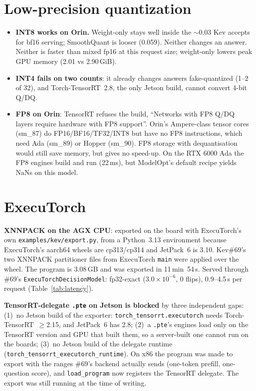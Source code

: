 \documentclass[10pt]{article}
\begin{document}
\section{Low-precision quantization}

\FloatBarrier
\begin{itemize}
\item \textbf{INT8 works on Orin.} Weight-only stays well inside the $\sim$0.03 Kev accepts for bf16 serving; SmoothQuant is looser (0.059). Neither changes an answer. Neither is faster than mixed fp16 at this request size; weight-only lowers peak GPU memory (2.01 vs 2.90\,GiB).
\item \textbf{INT4 fails on two counts}: it already changes answers fake-quantized (1--2 of 32), and Torch-TensorRT~2.8, the only Jetson build, cannot convert 4-bit Q/DQ.
\item \textbf{FP8 on Orin}: TensorRT refuses the build, ``Networks with FP8 Q/DQ layers require hardware with FP8 support''. Orin's Ampere-class tensor cores (sm\_87) do FP16/BF16/TF32/INT8 but have no FP8 instructions, which need Ada (sm\_89) or Hopper (sm\_90). FP8 storage with dequantisation would still save memory, but gives no speed-up. On the RTX 6000 Ada the FP8 engines build and run (22\,ms), but ModelOpt's default recipe yields NaNs on this model.
\end{itemize}

\section{ExecuTorch}
\textbf{XNNPACK on the AGX CPU}: exported on the board with ExecuTorch's own \texttt{examples/kev/export.py}, from a Python~3.13 environment because ExecuTorch's aarch64 wheels are cp313/cp314 and JetPack~6 is 3.10. Kev\#69's two XNNPACK partitioner files from ExecuTorch \texttt{main} were applied over the wheel. The program is 3.08\,GB and was exported in 11\,min~54\,s. Served through \#69's \texttt{ExecuTorchDecisionModel}: fp32-exact ($3.0\times10^{-6}$, 0 flips), 0.9--4.5\,s per request (Table~\ref{tab:latency}).

\smallskip\noindent\textbf{TensorRT-delegate \texttt{.pte} on Jetson is blocked} by three independent gaps:
(1)~no Jetson build of the exporter: \texttt{torch\_tensorrt.executorch} needs Torch-TensorRT~$\ge$2.15, and JetPack~6 has 2.8;
(2)~a \texttt{.pte}'s engines load only on the TensorRT version and GPU that built them, so a server-built one cannot run on the boards;
(3)~no Jetson build of the delegate runtime (\texttt{torch\_tensorrt\_executorch\_runtime}).
On x86 the program was made to export with the ranges \#69's backend actually sends (one-token prefill, one-question score), and \texttt{load\_program} now registers the TensorRT delegate. The export was still running at the time of writing.
\end{document}
